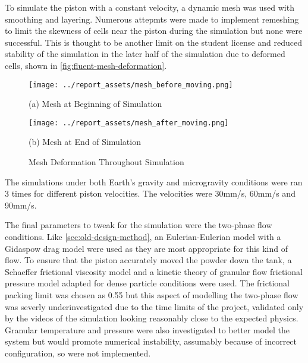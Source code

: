 To simulate the piston with a constant velocity, a dynamic mesh was used with smoothing and layering. Numerous attepmts were made to implement remeshing to limit the skewness of cells near the piston during the simulation but none were successful. This is thought to be another limit on the student license and reduced stability of the simulation in the later half of the simulation due to deformed cells, shown in \autoref{fig:fluent-mesh-deformation}.
\begin{figure}[htbp]
    \centering

    \begin{minipage}{0.45\textwidth}
        \centering
        \texttt{[image: ../report\_assets/mesh\_before\_moving.png]}
        \caption*{(a) Mesh at Beginning of Simulation}\label{fig:beginning-mesh}
    \end{minipage}
    \hfill
    \begin{minipage}{0.45\textwidth}
        \centering
        \texttt{[image: ../report\_assets/mesh\_after\_moving.png]}
        \caption*{(b) Mesh at End of Simulation}
    \end{minipage}
    \caption{Mesh Deformation Throughout Simulation}\label{fig:fluent-mesh-deformation}
\end{figure}
The simulations under both Earth's gravity and microgravity conditions were ran 3 times for different piston velocities. The velocities were 30mm/s, 60mm/s and 90mm/s.

The final parameters to tweak for the simulation were the two-phase flow conditions. Like \autoref{sec:old-design-method}, an Eulerian-Eulerian model with a Gidaspow drag model were used as they are most appropriate for this kind of flow. To ensure that the piston accurately moved the powder down the tank, a Schaeffer frictional viscosity model and a kinetic theory of granular flow frictional pressure model adapted for dense particle conditions were used. The frictional packing limit was chosen as 0.55 but this aspect of modelling the two-phase flow was severly underinvestigated due to the time limits of the project, validated only by the videos of the simulation looking reasonably close to the expected physics. Granular temperature and pressure were also investigated to better model the system but would promote numerical instability, assumably because of incorrect configuration, so were not implemented.


















